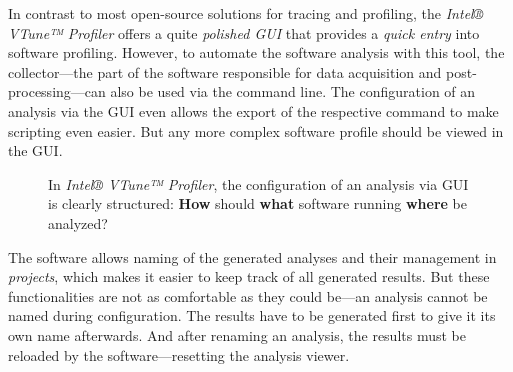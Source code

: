     In contrast to most open-source solutions for tracing and profiling, the \textit{Intel® VTune™ Profiler} offers a quite \emph{polished GUI} that provides a \emph{quick entry} into software profiling. However, to automate the software analysis with this tool, the collector---the part of the software responsible for data acquisition and post-processing---can also be used via the command line. The configuration of an analysis via the GUI even allows the export of the respective command to make scripting even easier. But any more complex software profile should be viewed in the GUI.

\begin{@empty}
    \setlength{\fboxsep}{0pt}%
    \setlength{\fboxrule}{1pt}%

    \begin{figure}[t]
        \vspace{.125em}
        \caption[Configuration of an analysis with Intel® VTune™ Profiler]{In \textit{Intel® VTune™ Profiler}, the configuration of an analysis via GUI is clearly structured: \textbf{How} should \textbf{what} software running \textbf{where} be analyzed?}
        \label{fig:vtuneconfig}
    \end{figure}
\end{@empty}

    The software allows naming of the generated analyses and their management in \emph{projects}, which makes it easier to keep track of all generated results. But these functionalities are not as comfortable as they could be---an analysis cannot be named during configuration. The results have to be generated first to give it its own name afterwards. And after renaming an analysis, the results must be reloaded by the software---resetting the analysis viewer.

